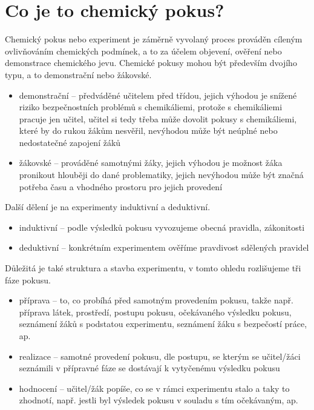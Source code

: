 
\section{Co je to chemický pokus?}
Chemický pokus nebo experiment je záměrně vyvolaný proces prováděn cíleným ovlivňováním chemických podmínek, a to za účelem objevení, ověření nebo demonstrace chemického jevu. Chemické pokusy mohou být především dvojího typu, a to demonstrační nebo žákovské.\cite{badani}
\begin{itemize}
  \item demonstrační -- předváděné učitelem před třídou, jejich výhodou je snížené riziko bezpečnostních problémů s chemikáliemi, protože s chemikáliemi pracuje jen učitel, učitel si tedy třeba může dovolit pokusy s chemikáliemi, které by do rukou žákům nesvěřil, nevýhodou může být neúplné nebo nedostatečné zapojení žáků
  \item žákovské -- prováděné samotnými žáky, jejich výhodou je možnost žáka pronikout hlouběji do dané problematiky, jejich nevýhodou může být značná potřeba času a vhodného prostoru pro jejich provedení
\end{itemize}
Další dělení je na experimenty induktivní a deduktivní.\cite{badani}
\begin{itemize}
  \item induktivní -- podle výsledků pokusu vyvozujeme obecná pravidla, zákonitosti
  \item deduktivní -- konkrétním experimentem ověříme pravdivost sdělených pravidel
\end{itemize}
Důležitá je také struktura a stavba experimentu, v tomto ohledu rozlišujeme tři fáze pokusu.\cite{badani}
\begin{itemize}
  \item příprava -- to, co probíhá před samotným provedením pokusu, takže např. příprava látek, prostředí, postupu pokusu, očekávaného výsledku pokusu, seznámení žáků s podstatou experimentu, seznámení žáku s bezpečostí práce, ap.
  \item realizace -- samotné provedení pokusu, dle postupu, se kterým se učitel/žáci seznámili v přípravné fáze se dostávají k vytyčenému výsledku pokusu
  \item hodnocení -- učitel/žák popíše, co se v rámci experimentu stalo a taky to zhodnotí, např. jestli byl výsledek pokusu v souladu s tím očekávaným, ap.
\end{itemize}


